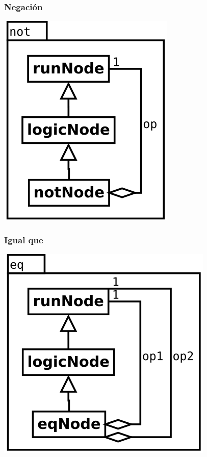 \subsubsection {Negación}
\begin{center}
\includegraphics[scale=0.4]{not.png} \\
\end{center}


\subsubsection {Igual que}
\begin{center}
\includegraphics[scale=0.4]{eq.png} \\
\end{center}

